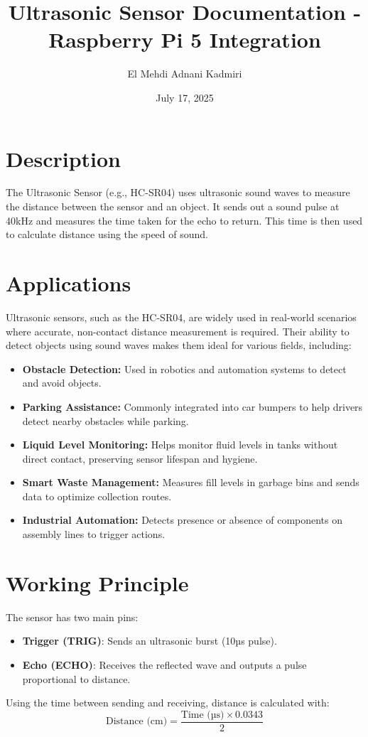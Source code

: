 \documentclass{article}
\title{Ultrasonic Sensor Documentation - Raspberry Pi 5 Integration}
\author{El Mehdi Adnani Kadmiri}
\date{July 17, 2025}
\begin{document}
	
	\maketitle
	
	\section{Description}
	The Ultrasonic Sensor (e.g., HC-SR04) uses ultrasonic sound waves to measure the distance between the sensor and an object. It sends out a sound pulse at 40kHz and measures the time taken for the echo to return. This time is then used to calculate distance using the speed of sound.
	
\section{Applications}

Ultrasonic sensors, such as the HC-SR04, are widely used in real-world scenarios where accurate, non-contact distance measurement is required. Their ability to detect objects using sound waves makes them ideal for various fields, including:

\begin{itemize}
	\item \textbf{Obstacle Detection:} Used in robotics and automation systems to detect and avoid objects.
	\item \textbf{Parking Assistance:} Commonly integrated into car bumpers to help drivers detect nearby obstacles while parking.
	\item \textbf{Liquid Level Monitoring:} Helps monitor fluid levels in tanks without direct contact, preserving sensor lifespan and hygiene.
	\item \textbf{Smart Waste Management:} Measures fill levels in garbage bins and sends data to optimize collection routes.
	\item \textbf{Industrial Automation:} Detects presence or absence of components on assembly lines to trigger actions.
\end{itemize}

	
	\section{Working Principle}
	The sensor has two main pins:
	\begin{itemize}
		\item \textbf{Trigger (TRIG)}: Sends an ultrasonic burst (10µs pulse).
		\item \textbf{Echo (ECHO)}: Receives the reflected wave and outputs a pulse proportional to distance.
	\end{itemize}
	Using the time between sending and receiving, distance is calculated with:
	\[
	\text{Distance (cm)} = \frac{\text{Time (µs)} \times 0.0343}{2}
	\]
	
\end{document}
